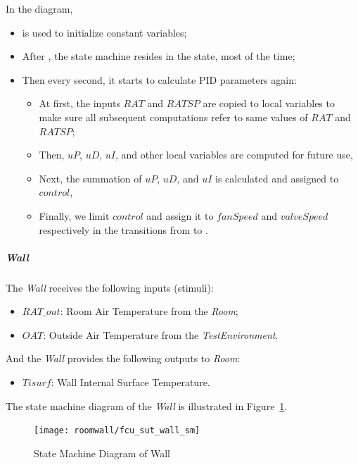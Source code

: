 In the diagram,
\begin{itemize}
    \item {} is used to initialize constant variables;
    \item After , the state machine resides in the  state, most of the time;
    \item Then every second, it starts to calculate PID parameters again:
        \begin{itemize}
            \item At first, the inputs $RAT$ and $RATSP$ are copied to local variables to make sure all subsequent computations refer to same values of $RAT$ and $RATSP$;
            \item Then, $uP$, $uD$, $uI$, and other local variables are computed for future use,
            \item Next, the summation of $uP$, $uD$, and $uI$ is calculated and assigned to $control$,
            \item Finally, we limit $control$ and assign it to $fanSpeed$ and $valveSpeed$ respectively in the transitions from  to .
        \end{itemize}
\end{itemize}

\subparagraph{Wall}
The \emph{Wall} receives the following inputs (stimuli):
\begin{itemize}
    \item $RAT\_out$: Room Air Temperature from the \emph{Room}; 
    \item $OAT$: Outside Air Temperature from the \emph{TestEnvironment}.
\end{itemize}

And the \emph{Wall} provides the following outputs to \emph{Room}:
\begin{itemize}
	\item $Tisurf$: Wall Internal Surface Temperature.
\end{itemize}

The state machine diagram of the \emph{Wall} is illustrated in Figure~\ref{fig:fcu_sut_wall_sm}.
\begin{figure}[htb!]
    \centering
	\texttt{[image: roomwall/fcu\_sut\_wall\_sm]}
    \caption{State Machine Diagram of Wall}
    \label{fig:fcu_sut_wall_sm}
\end{figure}


